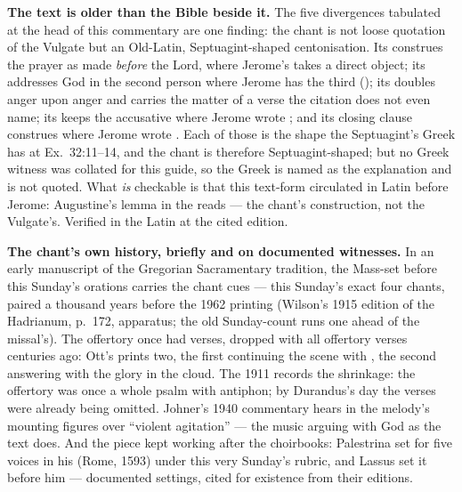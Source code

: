 \textbf{The text is older than the Bible beside it.} The five divergences
tabulated at the head of this commentary are one finding: the chant is not
loose quotation of the Vulgate but an Old-Latin, Septuagint-shaped
centonisation. Its  construes
the prayer as made \textit{before} the Lord, where Jerome's  takes a direct object; its  addresses God in the second person where Jerome has the third
(); its  doubles anger
upon anger and carries the matter of a verse the citation does not even name;
its  keeps the accusative where Jerome
wrote ; and its closing clause construes  where Jerome wrote . Each of those is the shape the Septuagint's Greek has
at Ex.\ 32:11--14, and the chant is therefore Septuagint-shaped; but no Greek
witness was collated for this guide, so the Greek is named as the explanation
and is not quoted. What \textit{is} checkable is that this text-form
circulated in Latin before Jerome: Augustine's lemma in the
 reads  --- the chant's construction, not the
Vulgate's. Verified in the Latin at the cited edition.

\textbf{The chant's own history, briefly and on documented witnesses.} In an
early manuscript of the Gregorian Sacramentary tradition, the Mass-set
before this Sunday's orations carries the chant cues  --- this Sunday's exact four chants, paired a thousand years
before the 1962 printing (Wilson's 1915 edition of the Hadrianum, p.~172,
apparatus; the old Sunday-count runs one ahead of the missal's). The
offertory once had verses, dropped with all offertory verses centuries ago:
Ott's  prints two, the first continuing the scene with
, the
second answering with the glory in the cloud. The 1911  records the shrinkage: the offertory was once a whole psalm
with antiphon; by Durandus's day the verses were already being omitted.
Johner's 1940 commentary hears in the melody's mounting figures over
 ``violent agitation'' --- the music arguing with God as the
text does. And the piece kept working after the choirbooks: Palestrina set
 for five voices in his  (Rome, 1593) under this very Sunday's rubric, and Lassus set it before
him --- documented settings, cited for existence from their editions.

